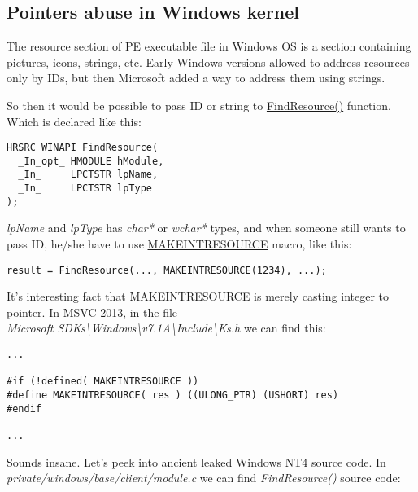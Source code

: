 \subsection{Pointers abuse in Windows kernel}

The resource section of PE executable file in Windows OS is a section containing pictures, icons, strings, etc.
Early Windows versions allowed to address resources only by IDs, but then Microsoft added a way to address them using strings.

So then it would be possible to pass ID or string to 
\href{https://msdn.microsoft.com/en-us/library/windows/desktop/ms648042%28v=vs.85%29.aspx}{FindResource()} function.
Which is declared like this:


\begin{lstlisting}[style=customc]
HRSRC WINAPI FindResource(
  _In_opt_ HMODULE hModule,
  _In_     LPCTSTR lpName,
  _In_     LPCTSTR lpType
);
\end{lstlisting}

\emph{lpName} and \emph{lpType} has \emph{char*} or \emph{wchar*} types, and when someone still wants to pass ID,
he/she have to use
\href{https://msdn.microsoft.com/en-us/library/windows/desktop/ms648029%28v=vs.85%29.aspx}{MAKEINTRESOURCE} macro, like this:


\begin{lstlisting}[style=customc]
result = FindResource(..., MAKEINTRESOURCE(1234), ...);
\end{lstlisting}

It's interesting fact that MAKEINTRESOURCE is merely casting integer to pointer.
In MSVC 2013, in the file\\
\emph{Microsoft SDKs\textbackslash{}Windows\textbackslash{}v7.1A\textbackslash{}Include\textbackslash{}Ks.h} we can find this:

\begin{lstlisting}[style=customc]
...

#if (!defined( MAKEINTRESOURCE )) 
#define MAKEINTRESOURCE( res ) ((ULONG_PTR) (USHORT) res)
#endif

...
\end{lstlisting}

Sounds insane. Let's peek into ancient leaked Windows NT4 source code.
In \emph{private/windows/base/client/module.c} we can find \emph{FindResource()} source code:

